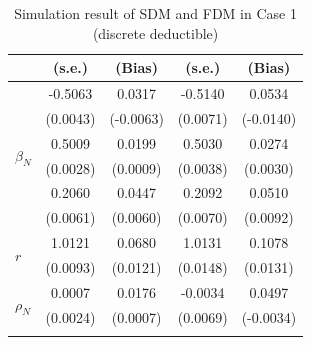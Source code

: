 \begin{table}[!ht]
{{\begin{minipage}{0.5\textwidth}
\begin{tabular}{lcccc}
        & (s.e.) & (Bias) & (s.e.) & (Bias) \\
        \midrule
        \multirow{6}{*}{$\beta_N$} & -0.5063 & 0.0317 & -0.5140 & 0.0534 \\
         & (0.0043) & (-0.0063) & (0.0071) & (-0.0140) \\
        \cmidrule{2-5}
         & 0.5009 & 0.0199 & 0.5030 & 0.0274 \\
         & (0.0028) & (0.0009) & (0.0038) & (0.0030) \\
        \cmidrule{2-5}
         & 0.2060 & 0.0447 & 0.2092 & 0.0510 \\
         & (0.0061) & (0.0060) & (0.0070) & (0.0092) \\
        \midrule
        \multirow{2}{*}{$r$} & 1.0121 & 0.0680 & 1.0131 & 0.1078 \\
         & (0.0093) & (0.0121) & (0.0148) & (0.0131) \\
        \midrule
        \multirow{2}{*}{$\rho_N$} & 0.0007 & 0.0176 & -0.0034 & 0.0497 \\
         & (0.0024) & (0.0007) & (0.0069) & (-0.0034) \\
        \hhline{=====}
        \end{tabular}
    \end{minipage}
}
}
\caption{Simulation result of SDM and FDM in Case 1 (discrete deductible)}\label{tab:AppSimEndCase1}
\end{table}
